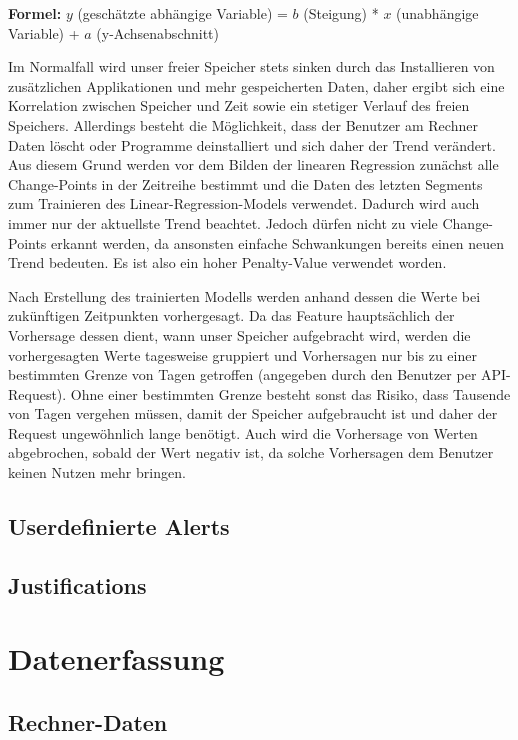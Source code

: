 \documentclass{report}
\begin{document}
 
\textbf{Formel:} \( y \) (geschätzte abhängige Variable) = \( b \) (Steigung) * \( x \) (unabhängige Variable) + \( a \) (y-Achsenabschnitt)\newline


Im Normalfall wird unser freier Speicher stets sinken durch das Installieren von zusätzlichen Applikationen und mehr gespeicherten Daten, daher ergibt sich eine Korrelation zwischen Speicher und Zeit sowie ein stetiger Verlauf des freien Speichers. Allerdings besteht die Möglichkeit, dass der Benutzer am Rechner Daten löscht oder Programme deinstalliert und sich daher der Trend verändert.
Aus diesem Grund werden vor dem Bilden der linearen Regression zunächst alle Change-Points in der Zeitreihe bestimmt und die Daten des letzten Segments zum Trainieren des Linear-Regression-Models verwendet. Dadurch wird auch immer nur der aktuellste Trend beachtet. Jedoch dürfen nicht zu viele Change-Points erkannt werden, da ansonsten einfache Schwankungen bereits einen neuen Trend bedeuten. Es ist also ein hoher Penalty-Value verwendet worden.\newline


Nach Erstellung des trainierten Modells werden anhand dessen die Werte bei zukünftigen Zeitpunkten vorhergesagt. Da das Feature hauptsächlich der Vorhersage dessen dient, wann unser Speicher aufgebracht wird, werden die vorhergesagten Werte tagesweise gruppiert und Vorhersagen nur bis zu einer bestimmten Grenze von Tagen getroffen (angegeben durch den Benutzer per API-Request).
Ohne einer bestimmten Grenze besteht sonst das Risiko, dass Tausende von Tagen vergehen müssen, damit der Speicher aufgebraucht ist und daher der Request ungewöhnlich lange benötigt. Auch wird die Vorhersage von Werten abgebrochen, sobald der Wert negativ ist, da solche Vorhersagen dem Benutzer keinen Nutzen mehr bringen.
\subsection{Userdefinierte Alerts}

\subsection{Justifications}

\section{Datenerfassung}
\subsection{Rechner-Daten}
\end{document}
